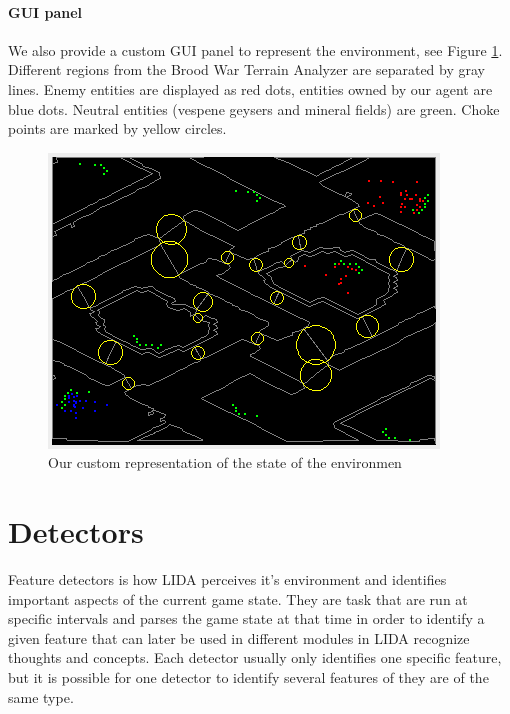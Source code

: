 \paragraph{GUI panel} We also provide a custom GUI panel to represent the environment, see Figure \ref{fig:environment-gui}. Different regions from the Brood War Terrain Analyzer are separated by gray lines. Enemy entities are displayed as red dots, entities owned by our agent are blue dots. Neutral entities (vespene geysers and mineral fields) are green. Choke points are marked by yellow circles.

\begin{figure}[h!tb]
\centering
\includegraphics{graphics/environment-gui.png}
\caption{Our custom representation of the state of the environmen}
\label{fig:environment-gui}
\end{figure}

\section{Detectors}
\label{sec:detectors}
Feature detectors is how LIDA perceives it's environment and identifies important aspects of the current game state. They are task that are run at specific intervals and parses the game state at that time in order to identify a given feature that can later be used in different modules in LIDA recognize thoughts and concepts. Each detector usually only identifies one specific feature, but it is possible for one detector to identify several features of they are of the same type. 

